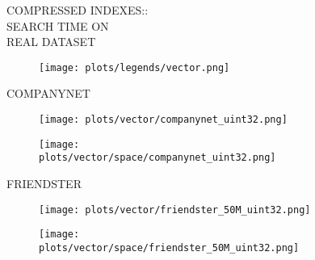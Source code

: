 \documentclass{article}
\begin{document}
\begin{figure}[!htbp]
\fbox
{
\begin{minipage}[t][0.98\textheight][t]{\textwidth}
\centering
\vspace*{-0.2cm}
    \begin{minipage}{0.23\linewidth}
    \footnotesize{COMPRESSED INDEXES::\\SEARCH TIME ON \\ REAL DATASET}
    \end{minipage}
   \begin{minipage}{0.75\linewidth}
        \begin{figure}[H]
        \texttt{[image: plots/legends/vector.png]}
        \end{figure}
    \end{minipage}

    \begin{minipage}{0.03\linewidth}
    \begin{sideways}\small COMPANYNET\end{sideways}
    \end{minipage}
    \begin{minipage}{0.32\linewidth}
        \begin{figure}[H]
        \texttt{[image: plots/vector/companynet\_uint32.png]}
        \end{figure}
    \end{minipage}
    \begin{minipage}{0.32\linewidth}
        \begin{figure}[H]
            \texttt{[image: plots/vector/space/companynet\_uint32.png]}
        \end{figure}
    \end{minipage}
    \vspace*{-15px}

    \begin{minipage}{0.03\linewidth}
    \begin{sideways}\small FRIENDSTER\end{sideways}
    \end{minipage}
    \begin{minipage}{0.32\linewidth}
        \begin{figure}[H]
        \texttt{[image: plots/vector/friendster\_50M\_uint32.png]}
        \end{figure}
    \end{minipage}
    \begin{minipage}{0.32\linewidth}
        \begin{figure}[H]
            \texttt{[image: plots/vector/space/friendster\_50M\_uint32.png]}
        \end{figure}
    \end{minipage}
    \vspace*{-15px}


\end{minipage}}
\end{figure}
\end{document}
